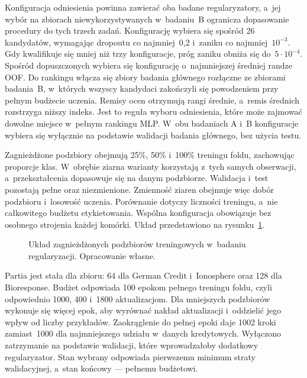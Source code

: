 Konfiguracja odniesienia powinna zawierać oba badane regularyzatory, a~jej wybór na zbiorach niewykorzystywanych w~badaniu~B ogranicza dopasowanie procedury do tych trzech zadań. Konfigurację wybiera się spośród 26 kandydatów, wymagając dropoutu co najmniej~0,2 i~zaniku co najmniej~$10^{-3}$. Gdy kwalifikuje się mniej niż trzy konfiguracje, próg zaniku obniża się do~$5\cdot10^{-4}$. Spośród dopuszczonych wybiera się konfigurację o~najmniejszej średniej randze OOF. Do rankingu włącza się zbiory badania głównego rozłączne ze zbiorami badania~B, w~których wszyscy kandydaci zakończyli się powodzeniem przy pełnym budżecie uczenia. Remisy ocen otrzymują rangi średnie, a~remis średnich rozstrzyga niższy indeks. Jest to reguła wyboru odniesienia, które może zajmować dowolne miejsce w~pełnym rankingu MLP. W~obu badaniach A i~B konfiguracje wybiera się wyłącznie na podstawie walidacji badania głównego, bez użycia testu.

Zagnieżdżone podzbiory obejmują 25\%, 50\% i~100\% treningu foldu, zachowując proporcje klas. W~obrębie ziarna warianty korzystają z~tych samych obserwacji, a~przekształcenia dopasowuje się na danym podzbiorze. Walidacja i~test pozostają pełne oraz niezmienione. Zmienność ziaren obejmuje więc dobór podzbioru i~losowość uczenia. Porównanie dotyczy liczności treningu, a~nie całkowitego budżetu etykietowania. Wspólna konfiguracja obowiązuje bez osobnego strojenia każdej komórki. Układ przedstawiono na rysunku~\ref{fig:podzbiory}.

\begin{figure}[tbp]\centering\small

\caption{Układ zagnieżdżonych podzbiorów treningowych w~badaniu regularyzacji. Opracowanie własne.}
\label{fig:podzbiory}
\end{figure}

Partia jest stała dla zbioru: 64 dla German Credit i~Ionosphere oraz 128 dla Bioresponse. Budżet odpowiada 100 epokom pełnego treningu foldu, czyli odpowiednio 1000, 400 i~1800 aktualizacjom. Dla mniejszych podzbiorów wykonuje się więcej epok, aby wyrównać nakład aktualizacji i~oddzielić jego wpływ od liczby przykładów. Zaokrąglenie do pełnej epoki daje 1002 kroki zamiast~1000 dla najmniejszego udziału w~danych kredytowych. Wyłączono zatrzymanie na podstawie walidacji, które wprowadzałoby dodatkowy regularyzator. Stan wybrany odpowiada pierwszemu minimum straty walidacyjnej, a~stan końcowy --- pełnemu budżetowi.

